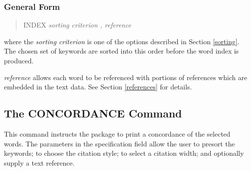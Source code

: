 \subsubsection{General Form}
\begin{quote}
INDEX           {\em sorting criterion , reference}
\end{quote}

where the {\em sorting criterion} is one of the options described
in Section \ref{sorting}.
The chosen set of keywords are sorted into this order before the
word index is produced.

{\em reference} allows each word to be referenced with portions of references
which are embedded in the text data.  See Section \ref{references} for details.

\subsection{The CONCORDANCE Command}
This command instructs the package to print a concordance
of the selected words.  The parameters in the specification
field allow the user to presort the keywords; to
choose the citation style; to select a citation width; and optionally
supply a text reference.

